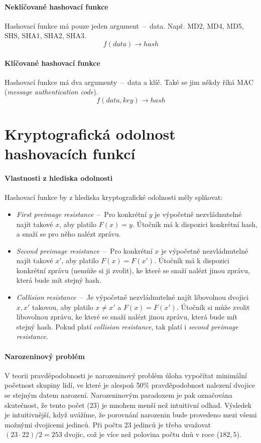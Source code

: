\paragraph*{Neklíčované hashovací funkce} Hashovací funkce má pouze jeden argument~--~data. Např. MD2, MD4, MD5, SHS, SHA1, SHA2, SHA3. $$f(data) \rightarrow hash$$

\paragraph*{Klíčované hashovací funkce} Hashovací funkce má dva argumenty~--~data a klíč. Také se jim někdy říká MAC (\textit{message authentication code}). $$f(data, key) \rightarrow hash$$


\section{Kryptografická odolnost hashovacích funkcí}

\paragraph*{Vlastnosti z hlediska odolnosti} Hashovací funkce by z hlediska kryptografické odolnosti měly splňovat: \begin{itemize}
    \item \textit{First preimage resistance}~--~Pro konkrétní $y$ je výpočetně nezvládnutelné najít takové $x$, aby platilo $F(x) = y$. Útočník má k dispozici konkrétní hash, a snaží se pro něho nalézt zprávu.
    \item \textit{Second preimage resistance}~--~Pro konkrétní $x$ je výpočetně nezvládnutelné najít takové $x'$, aby platilo $F(x) = F(x')$. Útočník má k dispozici konkrétní zprávu (nemůže si ji zvolit), ke které se snaží nalézt jinou zprávu, která bude mít stejný hash.
    \item \textit{Collision resistance}~--~Je výpočetně nezvládnutelné najít libovolnou dvojici $x, x'$ takovou, aby platilo $x \neq x'$ a $F(x) = F(x')$. Útočník si může zvolit libovolnou zprávu, ke které se snaží nalézt jinou zprávu, která bude mít stejný hash. Pokud platí \textit{collision resistance}, tak platí i \textit{second preimage resistance}.
\end{itemize}

\paragraph*{Narozeninový problém} V teorii pravděpodobnosti je narozeninový problém úloha vypočítat minimální početnost skupiny lidí, ve které je alespoň 50\% pravděpodobnost nalezení dvojice se stejným datem narození. Narozeninovým paradoxem je pak označována skutečnost, že tento počet (23) je mnohem menší než intuitivní odhad.
Výsledek je intuitivnější, když uvážíme, že porovnání narozenin bude provedeno mezi všemi možnými dvojicemi jedinců. Při počtu 23 jedinců je třeba uvažovat $(23 \cdot 22) / 2 = 253$ dvojic, což je více než polovina počtu dnů v roce ($182,5$).

